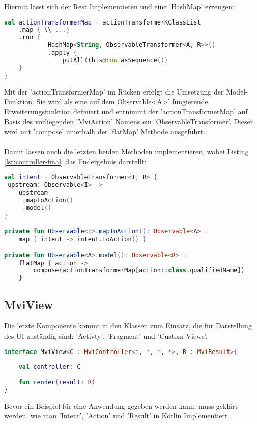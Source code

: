 \bigskip
Hiermit lässt sich der Rest Implementieren und eine 'HashMap' erzeugen:
\begin{lstlisting}[caption={apply Funktion}, label={lst:apply-function},language=Kotlin]
val actionTransformerMap = actionTransformerKClassList
	.map { \\ ...}
	.run {
			HashMap<String, ObservableTransformer<A, R>>()
			.apply {
				putAll(this@run.asSequence())
	}
}
\end{lstlisting}
\bigskip
Mit der 'actionTransformerMap' im Rücken erfolgt die Umsetzung der Model-Funktion. Sie wird als eine auf dem Observable<A>' fungierende Erweiterungsfunktion definiert und entnimmt der 'actionTransformerMap' auf Basis des vorliegenden 'MviAction' Namens  ein 'ObservableTransformer'. Dieser wird mit 'compose' innerhalb der 'flatMap' Methode ausgeführt.
\\\\
Damit lassen auch die letzten beiden Methoden implementieren, wobei Listing
\ref{lst:controller-final}
das Endergebnis darstellt:
\begin{lstlisting}[caption={Endergebnis}, label={lst:controller-final},language=Kotlin]
val intent = ObservableTransformer<I, R> {
 upstream: Observable<I> ->
	upstream
	 .mapToAction()
	 .model()
}

private fun Observable<I>.mapToAction(): Observable<A> =
	map { intent -> intent.toAction() }

private fun Observable<A>.model(): Observable<R> =
	flatMap { action ->
		compose(actionTransformerMap[action::class.qualifiedName])
	}
\end{lstlisting}

\subsection{MviView}
Die letzte Komponente kommt in den Klassen zum Einsatz, die für Darstellung des UI zuständig sind: 'Activty', 'Fragment' und 'Custom Views'.

\begin{lstlisting}[caption={MviView}, label={lst:mvi-view},language=Kotlin]
interface MviView<C : MviController<*, *, *, *>, R : MviResult>{
	
	val controller: C
	
	fun render(result: R)
}
\end{lstlisting}
\bigskip
Bevor ein Beispiel für eine Anwendung gegeben werden kann, muss geklärt werden, wie man 'Intent', 'Action' und 'Result' in Kotlin Implementiert. 
